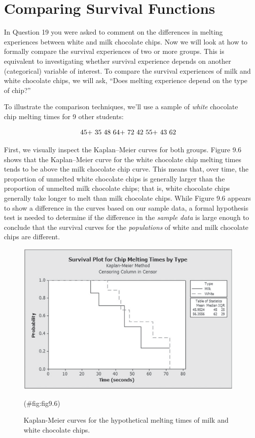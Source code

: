 \documentclass[
]{report}
\begin{document}
\section{\texorpdfstring{\textbf{Comparing Survival Functions}}{Comparing Survival Functions}}\label{comparing-survival-functions}

In Question 19 you were asked to comment on the differences in melting experiences between white and milk chocolate chips. Now we will look at how to formally compare the survival experiences of two or more groups. This is equivalent to investigating whether survival experience depends on another (categorical) variable of interest. To compare the survival experiences of milk and white chocolate chips, we will ask, ``Does melting experience depend on the type of chip?''

To illustrate the comparison techniques, we'll use a sample of \emph{white} chocolate chip melting times for 9 other students:

\begin{align}
\text{45+ 35 48 64+ 72 42 55+ 43 62}
\notag
\end{align}

First, we visually inspect the Kaplan--Meier curves for both groups. Figure 9.6 shows that the Kaplan--Meier curve for the white chocolate chip melting times tends to be above the milk chocolate chip curve. This means that, over time, the proportion of unmelted white chocolate chips is generally larger than the proportion of unmelted milk chocolate chips; that is, white chocolate chips generally take longer to melt than milk chocolate chips. While Figure 9.6 appears to show a difference in the curves based on our sample data, a formal hypothesis test is needed to determine if the difference in the \emph{sample data} is large enough to conclude that the survival curves for the \emph{populations} of white and milk chocolate chips are different.

\begin{figure}

{\centering \includegraphics[width=1\linewidth]{docs/Fig9_6} 

}

\caption{Kaplan-Meier curves for the hypothetical melting times of milk and white chocolate chips.}(\#fig:fig9.6)
\end{figure}
\end{document}
